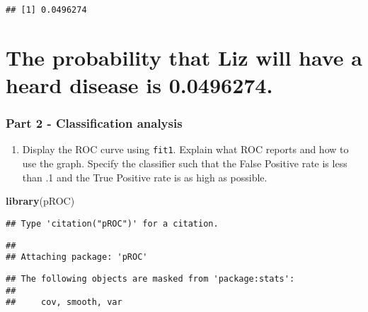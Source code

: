 \documentclass[]{article}
\newenvironment{Shaded}{\begin{snugshade}}{\end{snugshade}}
\newcommand{\KeywordTok}[1]{\textcolor[rgb]{0.13,0.29,0.53}{\textbf{#1}}}
\newcommand{\DataTypeTok}[1]{\textcolor[rgb]{0.13,0.29,0.53}{#1}}
\newcommand{\StringTok}[1]{\textcolor[rgb]{0.31,0.60,0.02}{#1}}
\newcommand{\OperatorTok}[1]{\textcolor[rgb]{0.81,0.36,0.00}{\textbf{#1}}}
\newcommand{\NormalTok}[1]{#1}
\providecommand{\tightlist}{%
  \setlength{\itemsep}{0pt}\setlength{\parskip}{0pt}}
\begin{document}
\begin{verbatim}
## [1] 0.0496274
\end{verbatim}

\section{The probability that Liz will have a heard disease is
0.0496274.}\label{the-probability-that-liz-will-have-a-heard-disease-is-0.0496274.}

\subsubsection{Part 2 - Classification
analysis}\label{part-2---classification-analysis}

\begin{enumerate}
\def\labelenumi{\alph{enumi}.}
\tightlist
\item
  Display the ROC curve using \texttt{fit1}. Explain what ROC reports
  and how to use the graph. Specify the classifier such that the False
  Positive rate is less than .1 and the True Positive rate is as high as
  possible.
\end{enumerate}

\begin{Shaded}
\begin{Highlighting}[]
\KeywordTok{library}\NormalTok{(pROC)}
\end{Highlighting}
\end{Shaded}

\begin{verbatim}
## Type 'citation("pROC")' for a citation.
\end{verbatim}

\begin{verbatim}
## 
## Attaching package: 'pROC'
\end{verbatim}

\begin{verbatim}
## The following objects are masked from 'package:stats':
## 
##     cov, smooth, var
\end{verbatim}

\begin{Shaded}
\end{Shaded}
\end{document}
